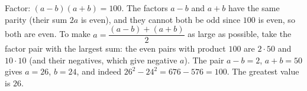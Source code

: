 Factor: $(a-b)(a+b)=100$. The factors $a-b$ and $a+b$ have the same parity (their sum $2a$ is even), and they cannot both be odd since $100$ is even, so both are even. To make $a=\dfrac{(a-b)+(a+b)}{2}$ as large as possible, take the factor pair with the largest sum: the even pairs with product $100$ are $2\cdot50$ and $10\cdot10$ (and their negatives, which give negative $a$). The pair $a-b=2$, $a+b=50$ gives $a=26$, $b=24$, and indeed $26^2-24^2=676-576=100$. The greatest value is $\boxed{26}$.
